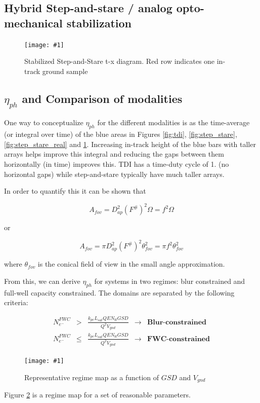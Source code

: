 \documentclass[10pt,journal]{IEEEtran}  %
\newcommand{\includefigure}[3]
{
  \begin{figure}[h!]
  \centering
  \texttt{[image: \#1]}
  \caption[]{#3}
  \label{#2}
  \end{figure}
}
\begin{document}
{\subsection{Hybrid Step-and-stare / analog opto-mechanical stabilization}

\includefigure{figures/stab_step_stare.pgf}{fig:stab_step_stare}{Stabilized Step-and-Stare t-x diagram.  Red row indicates one in-track ground sample}

\subsection{$\eta_{ph}$ and Comparison of modalities}
\label{sec:eta_ph}

One way to conceptualize $\eta_{ph}$ for the different modalities is as the time-average (or integral over time) of the blue areas in Figures \ref{fig:tdi}, \ref{fig:step_stare}, \ref{fig:step_stare_real} and \ref{fig:stab_step_stare}.  Increasing in-track height of the blue bars with taller arrays helps improve this integral and reducing the gaps between them horizontally (in time) improves this.  TDI has a time-duty cycle of 1. (no horizontal gaps) while step-and-stare typically have much taller arrays.

In order to quantify this it can be shown that

$$A_{fov} = D_{ap}^2 \left(F^\# \right)^2 \Omega = f^2 \Omega $$

or 

$$A_{fov} = \pi D_{ap}^2 \left(F^\# \right)^2 \theta_{fov}^2 = \pi f^2 \theta_{fov}^2$$

where $\theta_{fov}$ is the conical field of view in the small angle approximation.

From this, we can derive $\eta_{ph}$ for systems in two regimes: blur constrained and full-well capacity constrained.  The domains are separated by the following criteria:

\begin{align*}
    N_{e^-}^{FWC} &>& \frac{k_{pe}L_{sat}QE N_{bl} GSD}{Q^2 V_{gnd}} & \rightarrow &  \textbf{Blur-constrained} \\
    N_{e^-}^{FWC} &\leq& \frac{k_{pe}L_{sat}QE N_{bl} GSD}{Q^2 V_{gnd}} & \rightarrow &  \textbf{FWC-constrained}
\end{align*}

\includefigure{figures/blur_fwc_regime.pgf}{fig:eta_regime}{Representative regime map as a function of $GSD$ and $V_{gnd}$}

Figure \ref{fig:eta_regime} is a regime map for a set of reasonable parameters.

}
\end{document}
